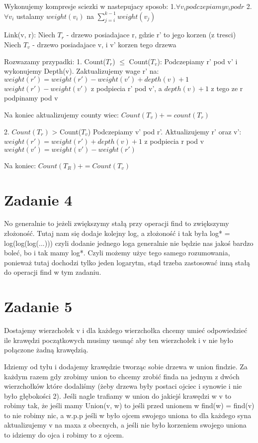 \documentclass[12pt]{article}
\begin{document}
Wykonujemy kompresje sciezki w nastepujacy sposob:
1.$\forall v_i podczepiamy v_i pod r$
2.$\forall v_i$ ustalamy $weight(v_i)$ na $\sum_{j=i}^{k-1} weight(v_j)$

Link(v, r):
Niech $T_r$ - drzewo posiadajace r, gdzie r' to jego korzen (z tresci)
Niech $T_v$ - drzewo posiadajace v, i v' korzen tego drzewa 

Rozwazamy przypadki:
1. Count($T_r$) $\leq$ Count($T_v$):
Podczepiamy r' pod v' i wykonujemy Depth(v).
Zaktualizujemy wage r' na:
$weight(r') = weight(r') - weight(v') + depth(v) + 1$
$weight(r') - weight(v')$ z podpiecia r' pod v', a $depth(v) +1$ z tego ze r podpinamy pod v

Na koniec aktualizujemy county wiec:
$Count(T_v) += count(T_r)$

2. $Count(T_r)$ > Count($T_v$)
Podczepiamy v' pod r'.
Aktualizujemy r' oraz v':
$weight(r') = weight(r') + depth(v) + 1$ z podpiecia r pod v
$weight(v') = weight(v') - weight(r')$

Na koniec:
$Count(T_R) += Count(T_v)$




\section{Zadanie 4}
No generalnie to jeżeli zwiększymy stałą przy operacji find to zwiększymy złożoność. Tutaj nam się dodaje kolejny log, a złożoność i tak była log* = log(log(log(...))) czyli dodanie jednego loga generalnie nie będzie nas jakoś bardzo boleć, bo i tak mamy log*. Czyli możemy użyc tego samego rozumowania, ponieważ tutaj dochodzi tylko jeden logarytm, stąd trzeba zastosować inną stałą do operacji find w tym zadaniu.

\section{Zadanie 5}
Dostajemy wierzchołek v i dla każdego wierzchołka chcemy umieć odpowiedzieć ile krawędzi początkowych musimy usunąć aby ten wierzchołek i v nie było połączone żadną krawędzią. 

Idziemy od tyłu i dodajemy krawędzie tworząc sobie drzewa w union findzie. Za każdym razem gdy zrobimy union to chcemy zrobić finda na jednym z dwóch wierzchołków które dodaliśmy (żeby drzewa były postaci ojciec i synowie i nie było głębokości 2). Jeśli nagle trafiamy w union do jakiejś krawędzi w v to robimy tak, że jeśli mamy Union(v, w) to jeśli przed unionem w find(w) = find(v) to nie robimy nic, a w.p.p jeśli w było ojcem swojego uniona to dla każdego syna aktualizujemy v na maxa z obecnych, a jeśli nie było korzeniem swojego uniona to idziemy do ojca i robimy to z ojcem.

\egroup
\end{document}
